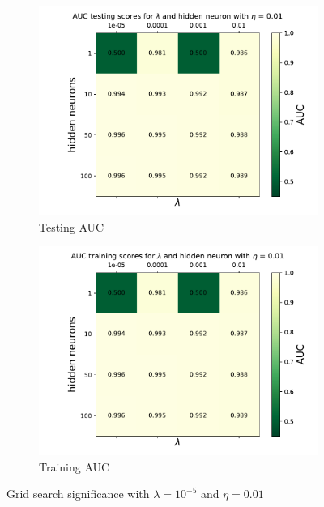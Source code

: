 \documentclass[14pt, a4paper]{book}
\begin{document}
\graphicspath{{../../../Plots/NeuralNetwork/FULL/GRID_layers_eta_neurons/AUC}}
\begin{figure}[!ht]
	\centering
	\begin{subfigure}[b]{0.49\textwidth}
        \centering
        \includegraphics[width=1\textwidth]{testing_nl.pdf}
        \caption{Testing AUC}
     \end{subfigure}
     \hfill
     \begin{subfigure}[b]{0.49\textwidth}
        \centering
        \includegraphics[width=1\textwidth]{training_nl.pdf}
        \caption{Training AUC}
     \end{subfigure}
     \caption{Grid search significance with $\lambda=10^{-5}$ and $\eta = 0.01$}\label{fig:DNN_GRID_AUC}
\end{figure}
\end{document}
